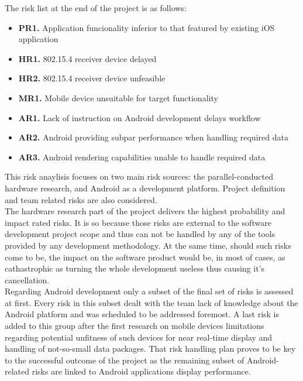 		The risk list at the end of the project is as follows:
		\begin{itemize}
		\item \textbf{PR1.} Application funcionality inferior to that featured by existing iOS application

		\item \textbf{HR1.} 802.15.4 receiver device delayed
		\item \textbf{HR2.} 802.15.4 receiver device unfeasible

		\item \textbf{MR1.} Mobile device unsuitable for target functionality

		\item \textbf{AR1.} Lack of instruction on Android development delays workflow
		\item \textbf{AR2.} Android providing subpar performance when handling required data
		\item \textbf{AR3.} Android rendering capabilities unable to handle required data
		\end{itemize}

		This risk anaylisis focuses on two main risk sources: the parallel-conducted hardware research, and Android as a development platform. Project definition and team related risks are also considered.\\

		The hardware research part of the project delivers the highest probability and impact rated risks. It is so because those risks are external to the software development project scope and thus can not be handled by any of the tools provided by any development methodology. At the same time, should such risks come to be, the impact on the software product would be, in most of cases, as cathastrophic as turning the whole development useless thus causing it's cancellation.\\
		
		Regarding Android development only a subset of the final set of risks is assessed at first. Every risk in this subset dealt with the team lack of knowledge about the Android platform and was scheduled to be addressed foremost. A last risk is added to this group after the first research on mobile devices limitations regarding potential unfitness of such devices for near real-time display and handling of not-so-small data packages. That risk handling plan proves to be key to the successful outcome of the project as the remaining subset of Android-related risks are linked to Android applications display performance.\\ %

